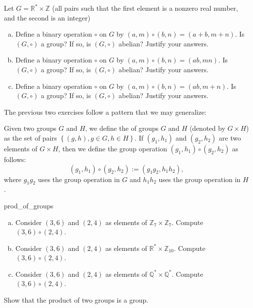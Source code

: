 \begin{exercise}{19}
Let $G = {\mathbb R}^{\ast} \times {\mathbb Z}$ (all pairs such that the first element is a nonzero real number, and the second is an integer) 
\begin{enumerate}[(a)]
\item
Define a binary operation $\circ$ on $G$ by $(a,m) \circ (b,n) = (a+b, m+n)$.  Is $(G , \circ)$ a group?  If so, is $(G , \circ)$ abelian?  Justify your answers.
\item
Define a binary operation $\circ$ on $G$ by $(a,m) \circ (b,n) = (ab, mn)$.  Is $(G , \circ)$ a group?  If so, is $(G , \circ)$ abelian?  Justify your answers.
\item
Define a binary operation $\circ$ on $G$ by $(a,m) \circ (b,n) = (ab, m+n)$.  Is $(G , \circ)$ a group?  If so, is $(G , \circ)$ abelian?  Justify your answers.
\end{enumerate}
\end{exercise}
The previous two exercises follow a pattern that we may generalize:

\begin{defn}\label{def:ProductOfGroups}
Given two groups $G$ and $H$, we define the  of groups $G$ and $H$ (denoted by $G \times H$) as the set of pairs $\left\{(g,h), g \in G, h \in H \right\}$. If $(g_1, h_1)$ and $(g_2,h_2)$ are two elements of $G \times H$, then we define the group operation  $(g_1, h_1) \circ (g_2, h_2)$ as follows: 
\[ (g_1, h_1) \circ (g_2, h_2) := (g_1g_2, h_1h_2),\]
where $g_1g_2$ uses the group operation in $G$ and $h_1h_2$ uses the group operation in $H$.
\end{defn}

\begin{exercise}{prod_of_groups}
\begin{enumerate}[(a)]
\item
Consider $(3,6)$ and $(2,4)$ as elements of ${\mathbb Z}_7 \times {\mathbb Z}_7$. Compute 
$(3,6) \circ (2,4)$.
\item
Consider $(3,6)$ and $(2,4)$ as elements of ${\mathbb R}^{\ast} \times {\mathbb Z}_{10}$. Compute 
$(3,6) \circ (2,4)$.
\item
Consider $(3,6)$ and $(2,4)$ as elements of ${\mathbb Q}^{\ast} \times {\mathbb Q}^{\ast}$. Compute 
$(3,6) \circ (2,4)$.
\end{enumerate}
\end{exercise}

\begin{exercise}{}
Show that the product of two groups is a group.
\end{exercise}

